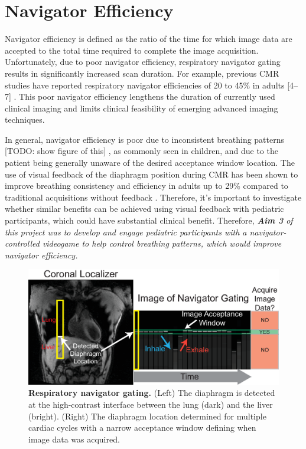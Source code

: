 \section{Navigator Efficiency}
	Navigator efficiency is defined as the ratio of the time for which image data are accepted to the total time required to complete the image acquisition. Unfortunately, due to poor navigator efficiency, respiratory navigator gating results in significantly increased scan duration. For example, previous CMR studies have reported respiratory navigator efficiencies of 20 to 45\% in adults [4–7] \cite{Abd-Elmoniem2011,Feuerlein2009,Jhooti2011,Wang1996}. This poor navigator efficiency lengthens the duration of currently used clinical imaging and limits clinical feasibility of emerging advanced imaging techniques.
	
	In general, navigator efficiency is poor due to inconsistent breathing patterns [TODO: show figure of this] \cite{Liu1993,Wang1995a,Taylor1997a}, as commonly seen in children, and due to the patient being generally unaware of the desired acceptance window location. The use of visual feedback of the diaphragm position during CMR has been shown to improve breathing consistency and efficiency in adults up to 29\% compared to traditional acquisitions without feedback \cite{Feuerlein2009,Jhooti2011}. Therefore, it's important to investigate whether similar benefits can be achieved using visual feedback with pediatric participants, which could have substantial clinical benefit. Therefore, \textit{\textbf{Aim 3} of this project was to develop and engage pediatric participants with a navigator-controlled videogame to help control breathing patterns, which would improve navigator efficiency.}
	
	\begin{figure}
		\centering
		\includegraphics{figures/intro/navigator_gating_explanation}
		\caption[Respiratory navigator gating]{\textbf{Respiratory navigator gating.} (Left) The diaphragm is detected at the high-contrast interface between the lung (dark) and the liver (bright). (Right) The diaphragm location determined for multiple cardiac cycles with a narrow acceptance window	defining when image data was acquired.}
		\label{fig:navigator_gating_explanation}
	\end{figure}

